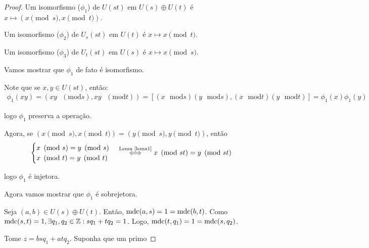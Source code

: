 	\begin{proof}
		Um isomorfismo ($\phi_1$) de $U(st)$ em $U(s)\oplus U(t)$ é 
		$x\mapsto (x\pmod s, x\pmod t)$.
		\par\vspace{0.3cm} Um isomorfismo ($\phi_2$) de $U_s(st)$ em $U(t)$ 
		é $x\mapsto x\pmod t$.
		\par\vspace{0.3cm} Um isomorfismo ($\phi_3$) de $U_t(st)$ em $U(s)$ 
		é $x\mapsto x\pmod s$.
		\par\vspace{0.3cm} Vamos mostrar que $\phi_1$ de fato é isomorfismo.
		\vspace{0.3cm}\par Note que se $x, y \in U(st)$, então: 
		\begin{align*} 
		    \phi_1(xy) 
		    = (xy\text{ }(\mathrm{mod} s), xy\text{ }(\mathrm{mod} t)) 
		    = [(x\text{ }\mathrm{mod} s)(y\text{ }\mathrm{mod} s), 
		    (x\text{ }\mathrm{mod} t)(y\text{ }\mathrm{mod} t)] 
		    = \phi_1(x)\phi_1(y)
		\end{align*} 
		\par\vspace{0.3cm} logo $\phi_1$ preserva a operação.
		\par\vspace{0.3cm} Agora, se $(x\pmod s, x\pmod t) 
		= (y\pmod s, y\pmod t)$, então 
		\begin{align*}
            \begin{cases}
                x\pmod s = y\pmod s \\ 
                x\pmod t = y\pmod t
            \end{cases} 
        \overset{\text{Lema \ref{lema1}}}{\iff } x\pmod {st} = y\pmod {st} 
		\end{align*}
		\par\vspace{0.3cm} logo $\phi_1$ é injetora.
		\par\vspace{0.3cm} Agora vamos mostrar que $\phi_1$ é sobrejetora.
		\par\vspace{0.3cm} Seja $(a,b)\in U(s)\oplus U(t)$. Então, 
		$\operatorname{mdc}(a,s) = 1 = \operatorname{mdc}(b,t)$. Como 
		$\operatorname{mdc}(s,t) = 1, \exists q_1, q_2\in \mathbb{Z}: sq_1 + tq_2 = 1$.
		Logo, $\operatorname{mdc}(t,q_1) = 1 = \operatorname{mdc}(s,q_2)$.
		\par\vspace{0.3cm} Tome $z = bsq_1 + atq_2$. Suponha que um primo 

\end{proof}
